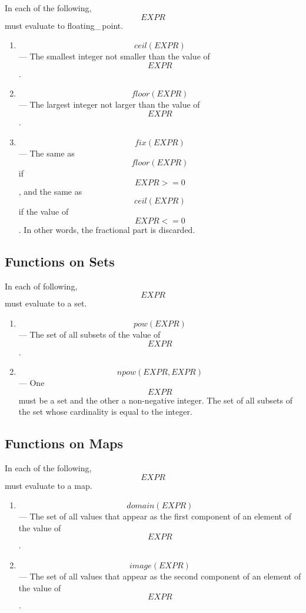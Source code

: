 {In each of the following, \[EXPR\] must evaluate to floating\_\,point.

\begin{enumerate}
\item
\[ceil(EXPR)\] ---
The smallest integer not smaller than the value of \[EXPR\]\@.

\item
\[floor(EXPR)\] ---  The largest integer not larger than
the value of \[EXPR\]\@.

\item
\[fix(EXPR)\] ---
The same as  \[floor(EXPR)\] if \[EXPR>=0\],
and the same as \[ceil(EXPR)\] if the value of \[EXPR<=0\].
In other words, the fractional part is discarded.
\end{enumerate}


\pagebreak[0]
\subsection{Functions on Sets}

In each of following, \[EXPR\] must evaluate to a set.

\begin{enumerate}

\item
\[pow(EXPR)\] --- The set of all subsets 
of the value of \[EXPR\]\@.

\item
\[npow(EXPR,EXPR)\] ---
One \[EXPR\] must be a set and the other a non-negative integer.
The set of all subsets of the set whose
cardinality is equal to the integer.
\end{enumerate}



\pagebreak[0]
\subsection{Functions on Maps}

In each of the following, \[EXPR\] must evaluate to a map.

\begin{enumerate}

\item
\[domain(EXPR)\] ---  The 
set of all values that appear as the first
component of an element of the value of \[EXPR\]\@.

\item
\[image(EXPR)\] ---  The 
set of all values that appear as the second
component of an element of the value of \[EXPR\]\@.
\end{enumerate}

}
